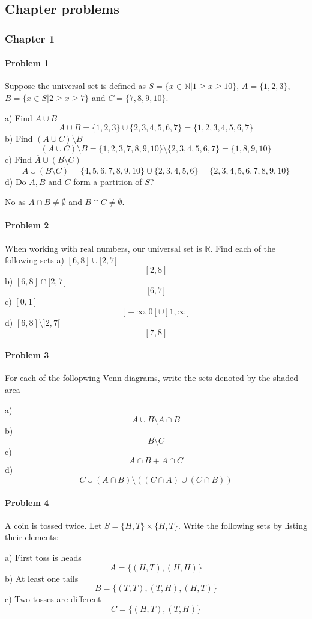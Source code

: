 \subsection{Chapter problems}
\subsubsection{Chapter 1}
\paragraph{Problem 1}
Suppose the universal set is defined as $S=\{x\in \mathbb{N} | 1\geq x \geq 10\}$, $A=\{1,2,3\}$, $B=\{x\in S|2\geq x\geq 7\}$ and $C=\{7,8,9,10\}$.

a) Find $A\cup B$
\[
    A\cup B=\{1,2,3\}\cup\{2,3,4,5,6,7\}=\{1,2,3,4,5,6,7\}
\]
b) Find $(A\cup C)\setminus B$
\[
    (A\cup C)\setminus B=\{1,2,3,7,8,9,10\}\setminus \{2,3,4,5,6,7\}=\{1,8,9,10\}
\]
c) Find $\overline{A}\cup(B\setminus C)$
\[
    \overline{A}\cup(B\setminus C)=\{4,5,6,7,8,9,10\}\cup\{2,3,4,5,6\}=\{2,3,4,5,6,7,8,9,10\}
\]
d) Do $A,B$ and $C$ form a partition of $S$?

No as $A\cap B\neq\emptyset$ and $B\cap C\neq\emptyset$.
\paragraph{Problem 2}
When working with real numbers, our universal set is $\mathbb{R}$. Find each of the following sets
a) $[6,8]\cup[2,7[$
\[
    [2,8]
\]
b) $[6,8]\cap[2,7[$
\[
    [6,7[
\]
c) $\overline{[0,1]}$
\[
    ]-\infty,0[\cup]1,\infty[
\]
d) $[6,8]\setminus ]2,7[$
\[
    [7,8]
\]
\paragraph{Problem 3}
For each of the follopwing Venn diagrams, write the sets denoted by the shaded area

a)
\[
    A\cup B\setminus A\cap B
\]
b)
\[
    B\setminus C
\]
c)
\[
    A\cap B+A\cap C
\]
d)
\[
    C\cup(A\cap B)\setminus ((C\cap A)\cup (C\cap B))
\]
\paragraph{Problem 4}
A coin is tossed twice. Let $S=\{H,T\}\times\{H,T\}$. Write the following sets by listing their elements:

a) First toss is heads
\[
    A=\{(H,T),(H,H)\}
\]
b) At least one tails
\[
    B=\{(T,T),(T,H),(H,T)\}
\]
c) Two tosses are different
\[
    C=\{(H,T),(T,H)\}
\]
